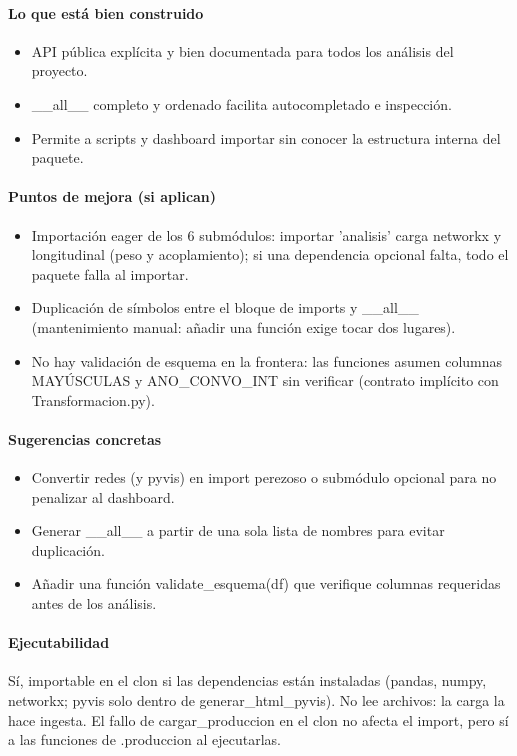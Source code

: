 \paragraph{Lo que está bien construido}
\begin{itemize}
  \item API pública explícita y bien documentada para todos los análisis del proyecto.
  \item \_\_all\_\_ completo y ordenado facilita autocompletado e inspección.
  \item Permite a scripts y dashboard importar sin conocer la estructura interna del paquete.
\end{itemize}

\paragraph{Puntos de mejora (si aplican)}
\begin{itemize}
  \item Importación eager de los 6 submódulos: importar 'analisis' carga networkx y longitudinal (peso y acoplamiento); si una dependencia opcional falta, todo el paquete falla al importar.
  \item Duplicación de símbolos entre el bloque de imports y \_\_all\_\_ (mantenimiento manual: añadir una función exige tocar dos lugares).
  \item No hay validación de esquema en la frontera: las funciones asumen columnas MAYÚSCULAS y ANO\_CONVO\_INT sin verificar (contrato implícito con Transformacion.py).
\end{itemize}

\paragraph{Sugerencias concretas}
\begin{itemize}
  \item Convertir redes (y pyvis) en import perezoso o submódulo opcional para no penalizar al dashboard.
  \item Generar \_\_all\_\_ a partir de una sola lista de nombres para evitar duplicación.
  \item Añadir una función validate\_esquema(df) que verifique columnas requeridas antes de los análisis.
\end{itemize}

\paragraph{Ejecutabilidad}
Sí, importable en el clon si las dependencias están instaladas (pandas, numpy, networkx; pyvis solo dentro de generar\_html\_pyvis). No lee archivos: la carga la hace ingesta. El fallo de cargar\_produccion en el clon no afecta el import, pero sí a las funciones de .produccion al ejecutarlas.

